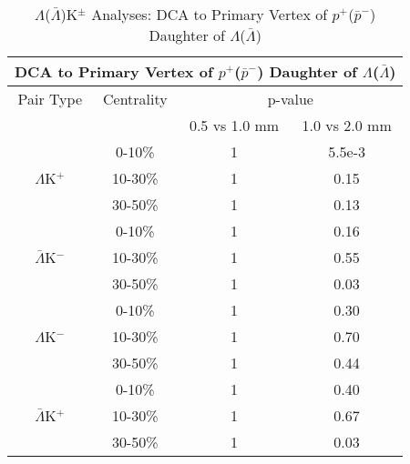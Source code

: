\documentclass[../AnalysisNoteJBuxton.tex]{subfiles}
\begin{document}
\begin{table}
 \centering
 \begin{tabular}{|c|c|c|c|}
 \multicolumn{4}{c}{DCA to Primary Vertex of $p^{+}$($\bar{p}^{-}$) Daughter of $\Lambda$($\bar{\Lambda}$)} \\
  \hline
  Pair Type & Centrality & \multicolumn{2}{c|}{p-value} \\
  \cline{3-4}
   & & 0.5 vs 1.0 mm & 1.0 vs 2.0 mm \\
  \hline  
   & 0-10\% & 1 & 5.5e-3 \\
  $\Lambda$K$^{+}$ 
   & 10-30\% & 1 & 0.15 \\
   & 30-50\% & 1 & 0.13 \\
  \hline
   & 0-10\% & 1 & 0.16 \\
  $\bar{\Lambda}$K$^{-}$ 
   & 10-30\% & 1 & 0.55 \\
   & 30-50\% & 1 & 0.03 \\
  \hline \hline
   & 0-10\% & 1 & 0.30 \\
  $\Lambda$K$^{-}$ 
   & 10-30\% & 1 & 0.70 \\
   & 30-50\% & 1 & 0.44 \\
  \hline
   & 0-10\% & 1 & 0.40 \\
  $\bar{\Lambda}$K$^{+}$ 
   & 10-30\% & 1 & 0.67 \\
   & 30-50\% & 1 & 0.03 \\
  \hline
 \end{tabular}
 \caption{$\Lambda$($\bar{\Lambda}$)K$^{\pm}$ Analyses: DCA to Primary Vertex of $p^{+}$($\bar{p}^{-}$) Daughter of $\Lambda$($\bar{\Lambda}$)}
 \label{tab:DcaToPrimVertexProtonDaughtOfLamLamKch}
\end{table}
\end{document}

